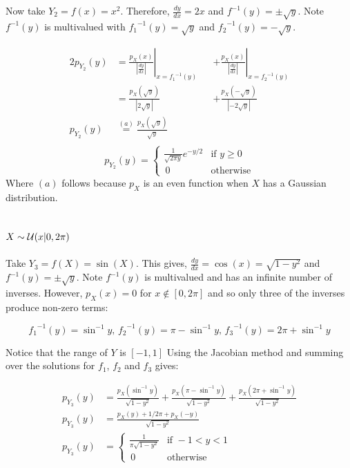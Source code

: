 \documentclass[12pt]{article}
\begin{document}
Now take $Y_2 = f(x)=x^2$. Therefore, $\frac{dy}{dx} = 2x$  and $f^{-1}(y) = \pm \sqrt{y}$. Note $f^{-1}(y)$ is multivalued with ${f_1}^{-1}(y) = \sqrt{y}$ and ${f_2}^{-1}(y) = -\sqrt{y}$.

\begin{alignat*}{2}
  p_{Y_2}(y)  
  &= \left. \frac {p_X(x)} {\left| \frac {dy} {dx} \right|} \right|_{x = {f_1} ^ {-1} (y)}
  && + \left. \frac {p_X (x)} {\left| \frac {dy} {dx} \right|} \right|_{x = {f_2} ^ {-1} (y)} \\
  &= \frac {p_X ( \sqrt y )} {\left| 2 \sqrt y \right|}  && + \frac {p_X (- \sqrt y)} {\left| - 2 \sqrt y \right|} \\
  p_{Y_2}(y) &\stackrel {(a)} {=} \frac {p_X (\sqrt y)} {\sqrt y} \\    
\end{alignat*}
\begin{equation}
  p_{Y_2}(y) = 
  \begin{cases} 
    \frac 1 {\sqrt{2 \pi y}} e ^ { - y /2} &\mbox{if } y \ge 0 \\
    \, 0 &\mbox{otherwise}
  \end{cases}
\end{equation}
Where $(a)$ follows because $p_X$ is an even function when $X$ has a Gaussian distribution.

\subsection{$X \sim {\cal U}(x|0, 2\pi)$}

Take $Y_3 = f(X) = \sin(X)$. This gives, $\frac{dy}{dx} = \cos(x) = \sqrt{1 - y^2}$  and $f^{-1}(y) = \pm \sqrt{y}$. Note $f^{-1}(y)$ is multivalued and has an infinite number of inverses. However, $p_X(x) = 0$ for $x \not\in [0, 2\pi]$ and so only three of the inverses produce non-zero terms: 

$$
{f_1}^{-1}(y) = \sin^{-1}{y}\mbox{, }{f_2}^{-1}(y) = \pi - \sin^{-1}{y}\mbox{, }{f_3}^{-1}(y) = 2\pi + \sin^{-1}{y}
$$

Notice that the range of $Y$ is $[-1, 1]$ Using the Jacobian method and summing over the solutions for $f_1$, $f_2$ and $f_3$ gives:

\begin{align}
  p_{Y_3}(y) &= \frac {p_X ( \sin^{-1} y )} {\sqrt{1 - y^2}}
  + \frac {p_X ( \pi - \sin^{-1} y )} {\sqrt{1 - y^2}}
  + \frac {p_X ( 2\pi + \sin^{-1} y )} {\sqrt{1 - y^2}} \\
  p_{Y_3}(y) &= \frac {p_X ( y ) + 1/2\pi + p_X ( -y )} {\sqrt{1 - y^2}} \\
  p_{Y_3}(y) &=
  \begin{cases} 
    \frac 1 {\pi\sqrt{1 - y^2}} &\mbox{if } -1 < y < 1 \\
    \, 0 &\mbox{otherwise}
  \end{cases}
\end{align}
\end{document}
